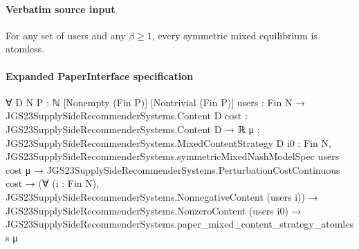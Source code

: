 \documentclass[10pt]{article}
\begin{document}
\paragraph{Verbatim source input}
\begin{ReviewVerbatim}
\begin{proposition}
\label{prop:atom}
For any set of users and any $\beta \ge 1$, every symmetric mixed equilibrium is atomless.
\end{proposition}
\end{ReviewVerbatim}



\paragraph{Expanded PaperInterface specification}
\begin{ReviewVerbatim}
∀ {D N P : ℕ} [Nonempty (Fin P)] [Nontrivial (Fin P)] {users : Fin N → JGS23SupplySideRecommenderSystems.Content D}
  {cost : JGS23SupplySideRecommenderSystems.Content D → ℝ}
  {μ : JGS23SupplySideRecommenderSystems.MixedContentStrategy D} {i0 : Fin N},
  JGS23SupplySideRecommenderSystems.symmetricMixedNashModelSpec users cost μ →
    JGS23SupplySideRecommenderSystems.PerturbationCostContinuous cost →
      (∀ (i : Fin N), JGS23SupplySideRecommenderSystems.NonnegativeContent (users i)) →
        JGS23SupplySideRecommenderSystems.NonzeroContent (users i0) →
          JGS23SupplySideRecommenderSystems.paper_mixed_content_strategy_atomless μ
\end{ReviewVerbatim}
\end{document}

